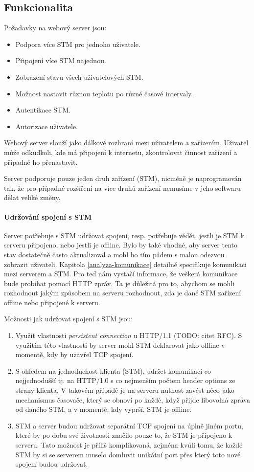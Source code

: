 
\subsection{Funkcionalita}
Požadavky na webový server jsou:
\begin{itemize}
  \item Podpora více STM pro jednoho uživatele.
  \item Připojení více STM najednou.
  \item Zobrazení stavu všech uživatelových STM.
  \item Možnost nastavit různou teplotu po různé časové intervaly.
  \item Autentikace STM.
  \item Autorizace uživatele.
\end{itemize}
Webový server slouží jako dálkové rozhraní mezi uživatelem a zařízením.
Uživatel může odkudkoli, kde má připojení k internetu, zkontrolovat činnost zařízení
a případně ho přenastavit.

Server podporuje pouze jeden druh zařízení (STM), nicméně je naprogramován
tak, že pro případné rozšíření na více druhů zařízení nemusíme v jeho softwaru dělat veliké změny.

\paragraph{Udržování spojení s STM}
Server potřebuje s STM udržovat spojení, resp. potřebuje vědět, jestli je STM k serveru připojeno,
nebo jestli je offline.
Bylo by také vhodné, aby server tento stav dostatečně často aktualizoval a mohl ho tím pádem s malou
odezvou zobrazit uživateli.
Kapitola \ref{analyza-komunikace} detailně specifikuje komunikaci mezi serverem a STM.
Pro teď nám vystačí informace, že veškerá komunikace bude probíhat pomocí HTTP zpráv.
Ta je důležitá pro to, abychom se mohli rozhodnout jakým způsobem na serveru rozhodnout, zda je dané
STM zařízení offline nebo připojené k serveru.

Možnosti jak udržovat spojení s STM jsou:
\begin{enumerate}
  \item Využít vlastnosti \emph{persistent connection} u HTTP/1.1 (TODO: citet RFC).
    S využitím této vlastnosti by server mohl STM deklarovat jako offline v momentě, kdy by uzavřel
    TCP spojení.
  \item S ohledem na jednoduchost klienta (STM), udržet komunikaci co nejjednodušší tj.
    na HTTP/1.0 s co nejmenším počtem header options ze strany klienta.
    V takovém případě je na serveru nutnost zavést něco jako mechanismus časovače, který se obnoví po každé,
    když přijde libovolná zpráva od daného STM, a v momentě, kdy vyprší, STM je offline.
  \item STM a server budou udržovat separátní TCP spojení na úplně jiném portu, které
    by po dobu své životnosti značilo pouze to, že STM je připojeno k serveru.
    Tato možnost je příliš komplikovaná, zejména kvůli tomu, že každé STM by si se serverem muselo domluvit
    unikátní port přes který toto nové spojení budou udržovat.
\end{enumerate}

